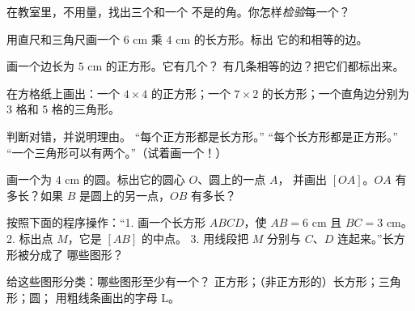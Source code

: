 \begin{exercise}[$\star$]\label{exo:g3:shapes:1}
在教室里，不用量，找出三个和一个
不是的角。你怎样\emph{检验}每一个？
\end{exercise}

\begin{exercise}[$\star$]\label{exo:g3:shapes:2}
用直尺和三角尺画一个 $6$ cm 乘 $4$ cm 的长方形。标出
它的和相等的边。
\end{exercise}

\begin{exercise}[$\star$]\label{exo:g3:shapes:3}
画一个边长为 $5$ cm 的正方形。它有几个？
有几条相等的边？把它们都标出来。
\end{exercise}

\begin{exercise}[$\star$]\label{exo:g3:shapes:4}
在方格纸上画出：一个 $4 \times 4$ 的正方形；一个 $7 \times 2$
的长方形；一个直角边分别为 $3$ 格和 $5$ 格的三角形。
\end{exercise}

\begin{exercise}[$\star$]\label{exo:g3:shapes:5}
判断对错，并说明理由。
“每个正方形都是长方形。”\quad
“每个长方形都是正方形。”\quad
“一个三角形可以有两个。”（试着画一个！）
\end{exercise}

\begin{exercise}[$\star$]\label{exo:g3:shapes:6}
画一个为 $4$ cm 的圆。标出它的圆心 $O$、圆上的一点 $A$，
并画出 $[OA]$。$OA$ 有多长？如果 $B$
是圆上的另一点，$OB$ 有多长？
\end{exercise}

\begin{exercise}[$\star$]\label{exo:g3:shapes:7}
按照下面的程序操作：“1. 画一个长方形 $ABCD$，使 $AB = 6$ cm
且 $BC = 3$ cm。2. 标出点 $M$，它是 $[AB]$ 的中点。
3. 用线段把 $M$ 分别与 $C$、$D$ 连起来。”长方形被分成了
哪些图形？
\end{exercise}

\begin{exercise}[$\star$]\label{exo:g3:shapes:8}
给这些图形分类：哪些图形至少有一个？
正方形；（非正方形的）长方形；三角形；圆；
用粗线条画出的字母 L。
\end{exercise}

